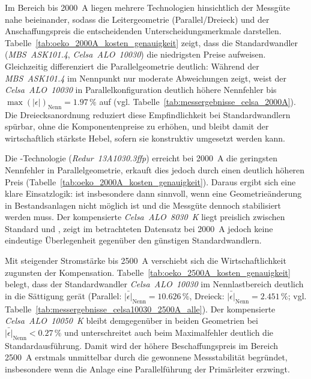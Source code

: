 Im Bereich bis \SI{2000}{A} liegen mehrere Technologien hinsichtlich der Messgüte nahe beieinander, sodass die Leitergeometrie (Parallel/Dreieck) und der Anschaffungspreis die entscheidenden Unterscheidungsmerkmale darstellen. Tabelle~\ref{tab:oeko_2000A_kosten_genauigkeit} zeigt, dass die Standardwandler (\textit{MBS~ASK101.4}, \textit{Celsa~ALO~10030}) die niedrigsten Preise aufweisen. Gleichzeitig differenziert die Parallelgeometrie deutlich: Während der \textit{MBS~ASK101.4} im Nennpunkt nur moderate Abweichungen zeigt, weist der \textit{Celsa~ALO~10030} in Parallelkonfiguration deutlich höhere Nennfehler bis \(\max(|\epsilon|)_{\mathrm{Nenn}}=\num{1,97}\,\%\) auf (vgl. Tabelle~\ref{tab:messergebnisse_celsa_2000A}). Die Dreiecksanordnung reduziert diese Empfindlichkeit bei Standardwandlern spürbar, ohne die Komponentenpreise zu erhöhen, und bleibt damit der wirtschaftlich stärkste Hebel, sofern sie konstruktiv umgesetzt werden kann.

Die -Technologie (\textit{Redur~13A1030.3ffp}) erreicht bei \SI{2000}{A} die geringsten Nennfehler in Parallelgeometrie, erkauft dies jedoch durch einen deutlich höheren Preis (Tabelle~\ref{tab:oeko_2000A_kosten_genauigkeit}). Daraus ergibt sich eine klare Einsatzlogik:  ist insbesondere dann sinnvoll, wenn eine Geometrieänderung in Bestandsanlagen nicht möglich ist und die Messgüte dennoch stabilisiert werden muss. Der kompensierte \textit{Celsa~ALO~8030~K} liegt preislich zwischen Standard und , zeigt im betrachteten Datensatz bei \SI{2000}{A} jedoch keine eindeutige Überlegenheit gegenüber den günstigen Standardwandlern.

Mit steigender Stromstärke bis \SI{2500}{A} verschiebt sich die Wirtschaftlichkeit zugunsten der Kompensation. Tabelle~\ref{tab:oeko_2500A_kosten_genauigkeit} belegt, dass der Standardwandler \textit{Celsa~ALO~10030} im Nennlastbereich deutlich in die Sättigung gerät (Parallel: \(\bar{|\epsilon|}_{\mathrm{Nenn}}=\num{10,626}\,\%\), Dreieck: \(\bar{|\epsilon|}_{\mathrm{Nenn}}=\num{2,451}\,\%\); vgl. Tabelle~\ref{tab:messergebnisse_celsa10030_2500A_alle}). Der kompensierte \textit{Celsa~ALO~10050~K} bleibt demgegenüber in beiden Geometrien bei \(\bar{|\epsilon|}_{\mathrm{Nenn}}<\num{0,27}\,\%\) und unterschreitet auch beim Maximalfehler deutlich die Standardausführung. Damit wird der höhere Beschaffungspreis im Bereich \SI{2500}{A} erstmals unmittelbar durch die gewonnene Messstabilität begründet, insbesondere wenn die Anlage eine Parallelführung der Primärleiter erzwingt.


